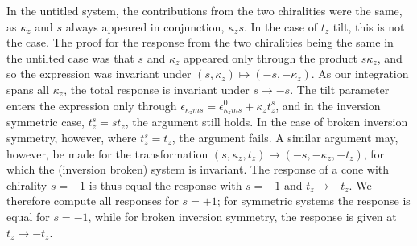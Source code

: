 In the untitled system, the contributions from the two chiralities were the same, as \( \kappa_z \) and \( s \) always appeared in conjunction, \( \kappa_z s \).
In the case of \( t_z \) tilt, this is not the case.
The proof for the response from the two chiralities being the same in the untilted case was that \( s \) and \( \kappa_z \) appeared only through the product \( s \kappa_z \), and so the expression was invariant under \( (s, \kappa_z) \mapsto (-s, -\kappa_z) \).
As our integration spans all \( \kappa_z \), the total response is invariant under \( s \to -s \).
The tilt parameter enters the expression only through \( \epsilon_{\kappa_z m s} = \epsilon_{\kappa_z m s}^0 + \kappa_z t^s_z \), and in the inversion symmetric case, \( t^s_z = s t_z \), the argument still holds.
In the case of broken inversion symmetry, however, where \( t^s_z = t_z \), the argument fails.
A similar argument may, however, be made for the transformation \( (s, \kappa_z, t_z) \mapsto (-s, -\kappa_z, -t_z) \), for which the (inversion broken) system is invariant.
The response of a cone with chirality \( s = -1 \) is thus equal the response with \( s = +1 \) and \( t_z \to -t_z \).
We therefore compute all responses for \( s=+1 \);
for symmetric systems the response is equal for \( s=-1 \), while for broken inversion symmetry, the response is given at \( t_z \to -t_z \).

